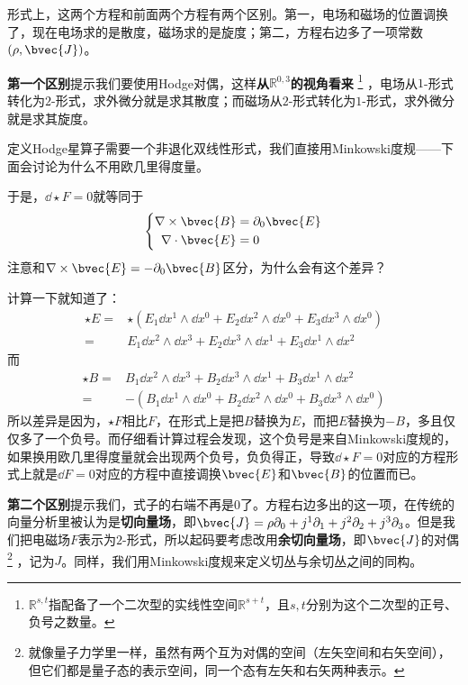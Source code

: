 形式上，这两个方程和前面两个方程有两个区别。第一，电场和磁场的位置调换了，现在电场求的是散度，磁场求的是旋度；第二，方程右边多了一项常数$(\rho, \bvec{J})$。

\textbf{第一个区别}提示我们要使用Hodge对偶，这样\textbf{从}$\mathbb{R}^{0,3}$\textbf{的视角看来}
\footnote{$\mathbb{R}^{s, t}$指配备了一个二次型的实线性空间$\mathbb{R}^{s+t}$，且$s, t$分别为这个二次型的正号、负号之数量。}
，电场从$1$-形式转化为$2$-形式，求外微分就是求其散度；而磁场从$2$-形式转化为$1$-形式，求外微分就是求其旋度。

定义Hodge星算子需要一个非退化双线性形式，我们直接用Minkowski度规——下面会讨论为什么不用欧几里得度量。

于是，$\dd\star F=0$就等同于
\begin{equation}
    \left\{
        \begin{aligned}
            \nabla\times \bvec{B} ={}& \partial_0\bvec{E}\\
            \nabla\cdot \bvec{E} ={}& 0
        \end{aligned}
    \right.
\end{equation}
注意和$\nabla\times\bvec{E}=-\partial_0\bvec{B}$区分，为什么会有这个差异？


计算一下就知道了：
\begin{equation}
    \begin{aligned}
        \star E ={}& \star (E_1\dd x^1\wedge \dd x^0 + E_2\dd x^2\wedge \dd x^0 + E_3\dd x^3\wedge \dd x^0)\\
        ={}& E_1\dd x^2\wedge \dd x^3 + E_2\dd x^3\wedge \dd x^1 + E_3\dd x^1\wedge \dd x^2
    \end{aligned}
\end{equation}
而
\begin{equation}
    \begin{aligned}
        \star B ={}& B_1\dd x^2\wedge \dd x^3+B_2\dd x^3\wedge \dd x^1 + B_3\dd x^1\wedge \dd x^2\\
        ={}& -(B_1\dd x^1\wedge \dd x^0 + B_2\dd x^2\wedge \dd x^0 + B_3\dd x^3\wedge \dd x^0)
    \end{aligned}
\end{equation}
所以差异是因为，$\star F$相比$F$，在形式上是把$B$替换为$E$，而把$E$替换为$-B$，多且仅仅多了一个负号。而仔细看计算过程会发现，这个负号是来自Minkowski度规的，如果换用欧几里得度量就会出现两个负号，负负得正，导致$\dd \star F=0$对应的方程形式上就是$\dd F=0$对应的方程中直接调换$\bvec{E}$和$\bvec{B}$的位置而已。


\textbf{第二个区别}提示我们，式子的右端不再是$0$了。方程右边多出的这一项，在传统的向量分析里被认为是\textbf{切向量场}，即$\bvec{J}=\rho\partial_0+j^1\partial_1+j^2\partial_2+j^3\partial_3$。但是我们把电磁场$F$表示为$2$-形式，所以起码要考虑改用\textbf{余切向量场}，即$\bvec{J}$的对偶
\footnote{就像量子力学里一样，虽然有两个互为对偶的空间（左矢空间和右矢空间），但它们都是量子态的表示空间，同一个态有左矢和右矢两种表示。}
，记为$J$。同样，我们用Minkowski度规来定义切丛与余切丛之间的同构。



